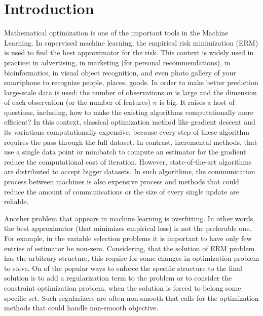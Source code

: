 \chapter{Introduction}
\label{ch:intro}

Mathematical optimization is one of the important tools in the Machine Learning. In supervised machine learning, the empirical risk minimization (ERM) is used to find the best approximator for the risk. This context is widely used in practice: in advertising, in marketing (for personal recommendations), in bioinformatics, in visual object recognition, and even photo gallery of your smartphone to recognize people, places, goods. In order to make better prediction large-scale data is used: the number of observations $m$ is large and the dimension of each observation (or the number of features) $n$ is big. It raises a host of questions, including, how to make the existing algorithms computationally more efficient? In this context, classical optimization method like gradient descent and its variations computationally expensive, because every step of these algorithm requires the pass through the full dataset. In contrast, incremental methods, that use a single data point or minibatch to compute an estimator for the gradient reduce the computational cost of iteration. However,  state-of-the-art algorithms are distributed to accept bigger datasets. In such algorithms, the communication process between machines is also expensive process and methods that could reduce the amount of communications or the size of every single update are reliable.

Another problem that appears in machine learning is overfitting. In other words, the best approximator (that minimizes empirical loss) is not the preferable one. For example, in the variable selection problems it is important to have only few entries of estimator be non-zero. Considering, that the solution of ERM problem has the arbitrary structure, this require for some changes in optimization problem to solve. On of the popular ways to enforce the specific structure to the final solution is to add a regularization term to the problem or to consider the constraint optimization problem, when the solution is forced to belong some specific set. Such regularizers are often non-smooth that calls for the optimization methods that could handle non-smooth objective. 


